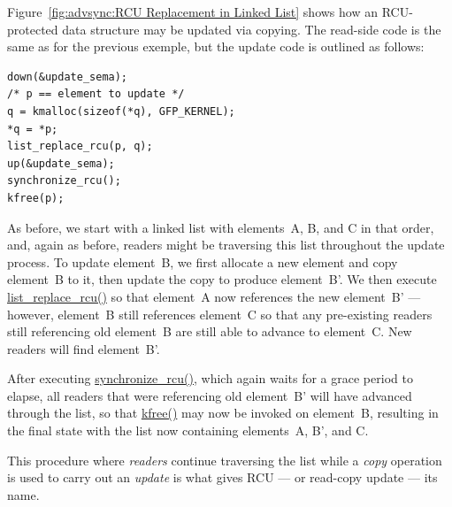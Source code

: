 Figure~\ref{fig:advsync:RCU Replacement in Linked List}
shows how an RCU-protected data structure may be updated via
copying.
The read-side code is the same as for the previous exemple, but
the update code is outlined as follows:

\vspace{5pt}
\begin{minipage}[t]{\columnwidth}
\begin{verbatim}
down(&update_sema);
/* p == element to update */
q = kmalloc(sizeof(*q), GFP_KERNEL);
*q = *p;
list_replace_rcu(p, q);
up(&update_sema);
synchronize_rcu();
kfree(p);
\end{verbatim}
\end{minipage}
\vspace{5pt}

As before, we start with a linked list with elements~A, B, and C
in that order, and, again as before, readers might be traversing
this list throughout the update process.
To update element~B, we first allocate a new element and copy element~B
to it, then update the copy to produce element~B'.
We then execute \url{list_replace_rcu()} so that element~A now
references the new element~B' --- however, element~B still references
element~C so that any pre-existing readers still referencing old element~B
are still able to advance to element~C.
New readers will find element~B'.

After executing \url{synchronize_rcu()}, which again waits for a grace
period to elapse, all readers that were referencing old element~B'
will have advanced through the list, so that \url{kfree()} may now
be invoked on element~B, resulting in the final state with the list
now containing elements~A, B', and C.

This procedure where \emph{readers} continue traversing the list
while a \emph{copy} operation is used to carry out an \emph{update}
is what gives RCU --- or read-copy update --- its name.

